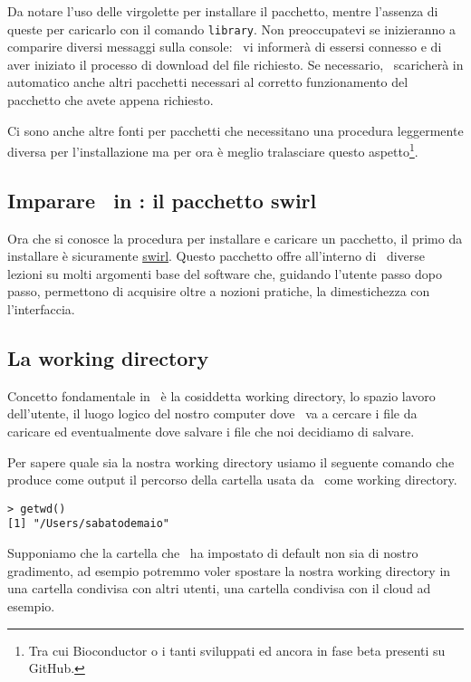 Da notare l'uso delle virgolette per installare il pacchetto, mentre l'assenza di queste per caricarlo con il comando \lstinline!library!. Non preoccupatevi se inizieranno a comparire diversi messaggi sulla console: \erre\ vi informerà di essersi connesso e di aver iniziato il processo di download del file richiesto. Se necessario, \erre\ scaricherà in automatico anche altri pacchetti necessari al corretto funzionamento del pacchetto che avete appena richiesto.

Ci sono anche altre fonti per pacchetti che necessitano una procedura leggermente diversa per l'installazione ma per ora è meglio tralasciare questo aspetto\footnote{Tra cui Bioconductor o i tanti sviluppati ed ancora in fase beta presenti su GitHub.}.

\subsection{Imparare \erre\ in \erre: il pacchetto swirl}

Ora che si conosce la procedura per installare e caricare un pacchetto, il primo da installare è sicuramente \href{http://swirlstats.com}{swirl}. Questo pacchetto offre all'interno di \erre\ diverse lezioni su molti argomenti base del software che, guidando l'utente passo dopo passo, permettono di acquisire oltre a nozioni pratiche, la dimestichezza con l'interfaccia.

\subsection{La working directory}

Concetto fondamentale in \erre\ è la cosiddetta working directory, lo spazio lavoro dell'utente, il luogo logico del nostro computer dove \erre\ va a cercare i file da caricare ed eventualmente dove salvare i file che noi decidiamo di salvare.

Per sapere quale sia la nostra working directory usiamo il seguente comando che produce come output il percorso della cartella usata da \erre\ come working directory.

\begin{lstlisting}
> getwd()
[1] "/Users/sabatodemaio"
\end{lstlisting}

Supponiamo che la cartella che \erre\ ha impostato di default non sia di nostro gradimento, ad esempio potremmo voler spostare la nostra working directory in una cartella condivisa con altri utenti, una cartella condivisa con il cloud ad esempio.

